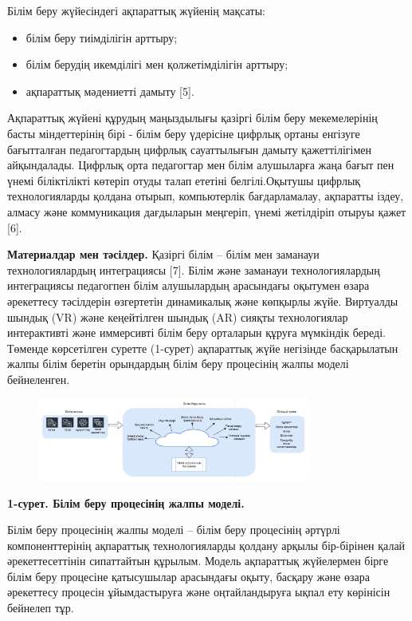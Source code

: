 Білім беру жүйесіндегі ақпараттық жүйенің мақсаты:

\begin{itemize}
\item
  білім беру тиімділігін арттыру;
\item
  білім берудің икемділігі мен қолжетімділігін арттыру;
\item
  ақпараттық мәдениетті дамыту {[}5{]}.
\end{itemize}

Ақпараттық жүйені құрудың маңыздылығы қазіргі білім беру мекемелерінің
басты міндеттерінің бірі - білім беру үдерісіне цифрлық ортаны енгізуге
бағытталған педагогтардың цифрлық сауаттылығын дамыту қажеттілігімен
айқындалады. Цифрлық орта педагогтар мен білім алушыларға жаңа бағыт пен
үнемі біліктілікті көтеріп отуды талап ететіні белгілі.Оқытушы цифрлық
технологияларды қолдана отырып, компьютерлік бағдарламалау, ақпаратты
іздеу, алмасу және коммуникация дағдыларын меңгеріп, үнемі жетілдіріп
отыруы қажет {[}6{]}.

{\bfseries Материалдар мен тәсілдер.} Қазіргі білім -- білім мен заманауи
технологиялардың интеграциясы {[}7{]}. Білім және заманауи
технологиялардың интеграциясы педагогпен білім алушылардың арасындағы
оқытумен өзара әрекеттесу тәсілдерін өзгертетін динамикалық және
көпқырлы жүйе. Виртуалды шындық (VR) және кеңейтілген шындық (AR) сияқты
технологиялар интерактивті және иммерсивті білім беру орталарын құруға
мүмкіндік береді. Төменде көрсетілген суретте (1-сурет) ақпараттық жүйе
негізінде басқарылатын жалпы білім беретін орындардың білім беру
процесінің жалпы моделі бейнеленген.

\begin{figure}[H]
	\centering
	\includegraphics[width=0.8\textwidth]{media/ict/image99}
	\caption*{}
\end{figure}


{\bfseries 1-сурет. Білім беру процесінің жалпы моделі.}

Білім беру процесінің жалпы моделі -- білім беру процесінің әртүрлі
компоненттерінің ақпараттық технологияларды қолдану арқылы бір-бірінен
қалай әрекеттесеттінін сипаттайтын құрылым. Модель ақпараттық жүйелермен
бірге білім беру процесіне қатысушылар арасындағы оқыту, басқару және
өзара әрекеттесу процесін ұйымдастыруға және оңтайландыруға ықпал ету
көрінісін бейнелеп тұр.

